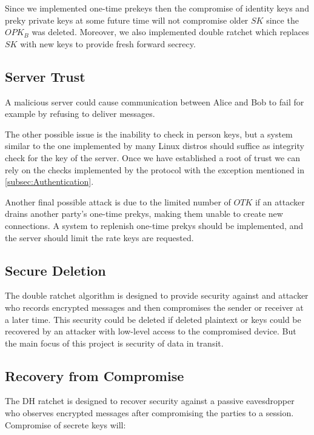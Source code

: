 Since we implemented one-time prekeys then the compromise of identity keys and preky private keys at some future time will not compromise older $SK$ since the $OPK_B$ was deleted. Moreover, we also implemented double ratchet which replaces $SK$ with new keys to provide fresh forward secrecy.

\subsection{Server Trust}
\label{subsec:ServerTrust}

A malicious server could cause communication between Alice and Bob to fail for example by refusing to deliver messages.

The other possible issue is the inability to check in person keys, but a system similar to the one implemented by many Linux distros should suffice as integrity check for the key of the server. Once we have established a root of trust we can rely on the checks implemented by the protocol with the exception mentioned in \ref{subsec:Authentication}.

Another final possible attack is due to the limited number of $OTK$ if an attacker drains another party's one-time prekys, making them unable to create new connections. A system to replenish one-time prekys should be implemented, and the server should limit the rate keys are requested.

\subsection{Secure Deletion}
\label{subsec:SecureDeletion}

The double ratchet algorithm is designed to provide security against and attacker who records encrypted messages and then compromises the sender or receiver at a later time. This security could be deleted if deleted plaintext or keys could be recovered by an attacker with low-level access to the compromised device. But the main focus of this project is security of data in transit.

\subsection{Recovery from Compromise}
\label{subsec:RecoveryFromCompromise}

The DH ratchet is designed to recover security against a passive eavesdropper who observes encrypted messages after compromising the parties to a session. Compromise of secrete keys will:

